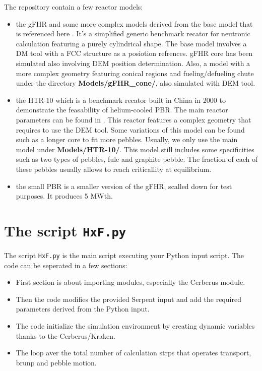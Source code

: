 \documentclass{article}
\begin{document}
The repository contain a few reactor models:
\begin{itemize}
\item the gFHR and some more complex models derived from the base model that is referenced here \cite{gFHR}. It's a simplified generic benchmark recator for neutronic calculation featuring a purely cylindrical shape. The base model involves a DM tool with a FCC structure as a posiotion refrences. gFHR core has been simulated also involving DEM position determination. Also, a model with a more complex geometry featuring conical regions and fueling/defueling chute under the directory \textbf{Models/gFHR\_cone/}, also simulated with DEM tool.

\item the HTR-10 which is a benchmark recator built in China in 2000 to demonstrate the feasability of helium-cooled PBR. The main reactor parameters can be found in \cite{INL_report_HTR-10}. This reactor features a complex geometry that requires to use the DEM tool. Some variations of this model can be found such as a longer core to fit more pebbles. Usually, we only use the main model under \textbf{Models/HTR-10/}. This model still includes some specificities such as two types of pebbles, fule and graphite pebble. The fraction of each of these pebbles usually allows to reach criticallity at equilibrium. 

\item the small PBR is a smaller version of the gFHR, scalled down for test purposes. It produces 5 MWth. 


\end{itemize}
\newpage
\section{The script \texttt{HxF.py}}\label{sec:HxF}
The script \texttt{HxF.py} is the main script executing your Python input script. The code can be seperated in a few sections:
\begin{itemize}
    \item First section is about importing modules, especially the Cerberus module. 
    \item Then the code modifies the provided Serpent input and add the required parameters derived from the Python input.
    \item The code initialize the simulation environment by creating dynamic variables thanks to the Cerberus/Kraken.
    \item The loop aver the total number of calculation strps that operates transport, brunp and pebble motion.
\end{itemize}
\end{document}
